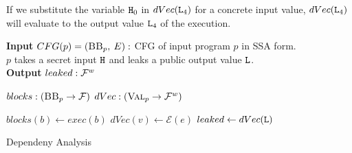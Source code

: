 If we substitute the variable $\mathtt{H}_0$ in $dVec(\mathtt{L}_4)$ for a concrete input value, $dVec(\mathtt{L}_4)$ will evaluate to the output value $\mathtt{L}_4$ of the execution.

\begin{algorithm}
        \hspace*{\algorithmicindent} \textbf{Input} $CFG(p) = (\mbb_p, \: E):$ CFG of input program $p$ in SSA form.\\ 
        \hspace*{\algorithmicindent} \hspace*{\algorithmicindent} $p$ takes a secret input $\mathtt{H}$ and leaks a public output value $\mathtt{L}$. \\
        \hspace*{\algorithmicindent} \textbf{Output} $leaked: \mathcal{F}^w$\\
        \begin{algorithmic}[1]
            \State $blocks: (\mbb_p \to \mbform)$
            \State $dVec: (\textsc{Val}_p \to \mathcal{F}^w)$
            
                \State $blocks(b) \leftarrow exec(b)$
                    \State $dVec(v) \leftarrow \mathcal{E}(e)$
                \EndFor
            \EndFor
            \State $leaked \leftarrow dVec(\mathtt{L})$
    \end{algorithmic} 
    \caption{Dependeny Analysis}\label{alg:depAna}
\end{algorithm}

